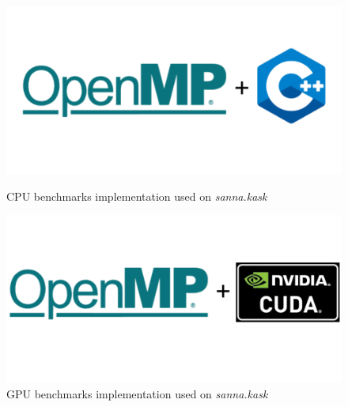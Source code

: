 \begin{figure}[hbt!]
    \centering
    \captionsetup{width=.46\linewidth}
    \begin{minipage}[t]{0.46\textwidth}
        \includegraphics[width=\textwidth]{figures/implementations/OMP-CPP_logo.png}
        \caption{CPU benchmarks implementation used on \emph{sanna.kask}}\label{fig:cpus_implementation_sanna.kask}
    \end{minipage}
    \hspace{1cm}
    \centering
    \captionsetup{width=.46\linewidth}
    \begin{minipage}[t]{0.46\textwidth}
        \includegraphics[width=\textwidth]{figures/implementations/OMP-CUDA_logo.png}
        \caption{GPU benchmarks implementation used on \emph{sanna.kask}}\label{fig:gpus_implementation_sanna.kask}
    \end{minipage}
\end{figure}

